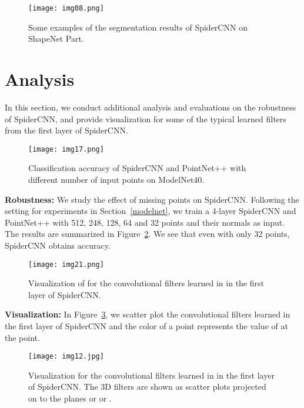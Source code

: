 \documentclass[runningheads]{llncs}
\begin{document}
\begin{figure}
\centering
\texttt{[image: img08.png]} 
\caption{Some examples of the segmentation results of SpiderCNN on ShapeNet Part.}
\label{fig:sipidercnn}
\end{figure}


\section{Analysis}


In this section, we conduct additional analysis and evaluations on the robustness of SpiderCNN, and provide visualization for some of the typical  learned filters from the first layer of SpiderCNN.


\begin{figure}
\centering
\texttt{[image: img17.png]} 
\caption{
Classification accuracy of SpiderCNN and PointNet++ with different number of input points on ModelNet40.
}
\label{fig:robust}
\end{figure}

{\noindent \bf Robustness:}
We study the effect of missing points on SpiderCNN. Following the setting for experiments in Section~\ref{modelnet}, we train a 4-layer SpiderCNN and PointNet++ with 512, 248, 128, 64 and 32 points and their normals as input. The results are summarized in Figure~\ref{fig:robust}. We see that even with only 32 points, SpiderCNN obtains  accuracy.



\begin{figure} 
\centering 
\texttt{[image: img21.png]} 
\caption{
Visualization of  for the convolutional filters learned in in the first layer of SpiderCNN. 
}
\label{fig:3dvisual}
\end{figure}

{\noindent \bf Visualization:}
In Figure~\ref{fig:3dvisual}, we scatter plot the convolutional filters  learned in the first layer of SpiderCNN and the color of a point represents the value of  at the point. 



\begin{figure}
\centering
\texttt{[image: img12.jpg]} 
\caption{
Visualization for the convolutional filters learned in in the first layer of SpiderCNN. The 3D filters are shown as scatter plots projected on to the planes  or  or . 
}
\label{fig:filters2d}
\end{figure}
\end{document}

